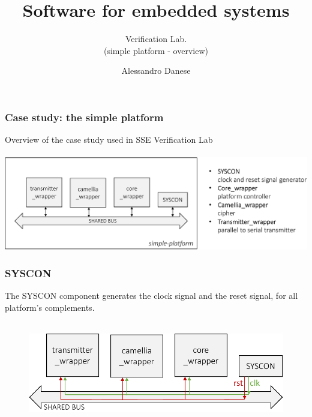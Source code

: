 \documentclass{beamer}
\title[About Beamer] %
{Software for embedded systems}
\subtitle{Verification Lab.\\ (simple platform - overview)}
\author{Alessandro Danese}
\institute{University of Verona, Verona, Italy\\alessandro.danese@univr.it}
\begin{document}
 
\frame{\titlepage}
 

\begin{frame}
\frametitle{Case study: the simple platform}
\centering
Overview of the case study used in SSE Verification Lab\\~\\
\includegraphics[width=1\columnwidth]{figures/platform-overview-crop.pdf}
\end{frame}
 
\begin{frame}
\frametitle{SYSCON}
The SYSCON component generates the clock signal and the reset signal, 
for all platform's complements.\\~\\

\begin{figure}
	\centering
	\includegraphics[width=0.9\columnwidth]{figures/syscon-crop.pdf}
\end{figure}

\end{frame}
\end{document}
